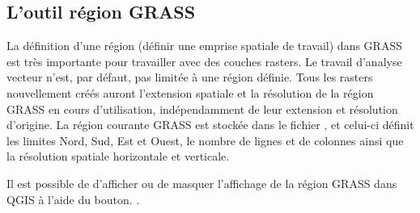 \subsection{L'outil r\'egion GRASS}\label{sec:grass_region}

La d\'efinition d'une r\'egion (d\'efinir une emprise spatiale de travail) dans GRASS est tr\`es importante pour travailler avec des couches rasters. Le travail d'analyse vecteur n'est, par d\'efaut, pas limit\'ee \`a une r\'egion d\'efinie. Tous les rasters nouvellement cr\'e\'es auront l'extension spatiale et la r\'esolution de la r\'egion GRASS en cours d'utilisation, ind\'ependamment de leur extension et r\'esolution d'origine. La r\'egion courante GRASS est stock\'ee dans le fichier , et celui-ci d\'efinit les limites Nord, Sud, Est et Ouest, le nombre de lignes et de colonnes ainsi que la r\'esolution spatiale horizontale et verticale.

Il est possible de d'afficher ou de masquer l'affichage de la r\'egion GRASS dans QGIS \`a l'aide du bouton. .

